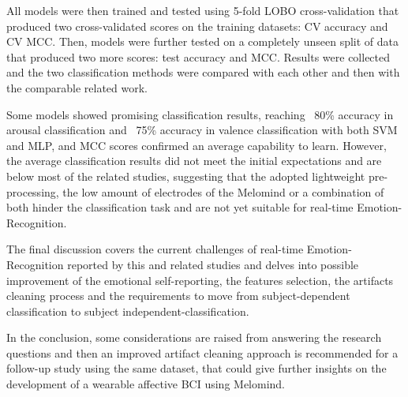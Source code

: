 All models were then trained and tested using 5-fold LOBO cross-validation that produced two cross-validated scores on the training datasets: CV accuracy and CV MCC. Then, models were further tested on a completely unseen split of data that produced two more scores: test accuracy and MCC. Results were collected and the two classification methods were compared with each other and then with the comparable related work. 

Some models showed promising classification results, reaching ~80\% accuracy in arousal classification and ~75\% accuracy in valence classification with both SVM and MLP, and MCC scores confirmed an average capability to learn. However, the average classification results did not meet the initial expectations and are below  most of the related studies, suggesting that the adopted lightweight pre-processing, the low amount of electrodes of the Melomind or a combination of both hinder the classification task and are not yet suitable for real-time Emotion-Recognition.

The final discussion covers the current challenges of real-time Emotion-Recognition reported by this and related studies and delves into possible improvement of the emotional self-reporting, the features selection, the artifacts cleaning process and the requirements to move from subject-dependent classification to subject independent-classification.

In the conclusion, some considerations are raised from answering the research questions and then an improved artifact cleaning approach is recommended for a follow-up study using the same dataset, that could give further insights on the development of a wearable affective \ac{BCI} using Melomind.
